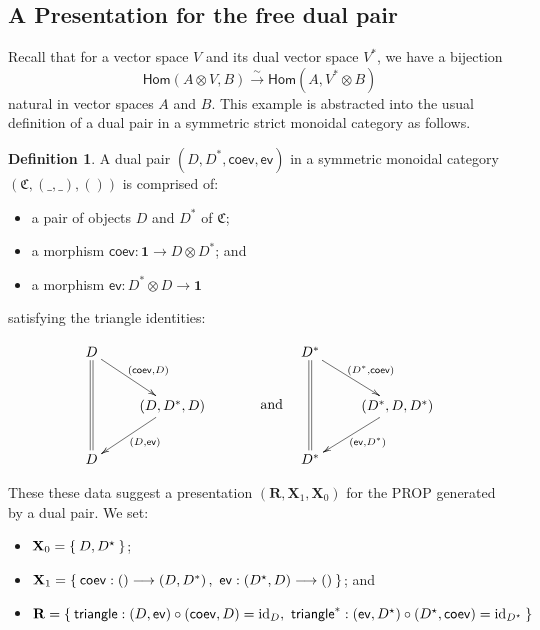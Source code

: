 \documentclass[pra,floatfix,
amsmath,superscriptaddress, 12pt]{article}
\theoremstyle{definition}
\newtheorem{defn}[thm]{Definition}
\newcommand{\liso}{\overset{\sim}{\longrightarrow}}
\newcommand{\evmap}{\mathsf{ev}}
\newcommand{\coev}{\mathsf{coev}}
\DeclareMathOperator{\id}{{\normalfont\text{id}}}
\begin{document}
\subsection{A Presentation for the free dual pair}
Recall that for a vector space $V$ and its dual vector space $V^{*}$,
we have a bijection 
\[
\mathsf{Hom}\left(A\otimes V,B\right)\liso\mathsf{Hom}\left(A,V^{*}\otimes B\right)
\]
 natural in vector spaces $A$ and $B$. This example is abstracted
into the usual definition of a dual pair in a symmetric strict monoidal
category as follows.
\begin{defn}
A dual pair $\left(D,D^{*},\coev,\evmap\right)$ in a symmetric monoidal
category $\left(\mathfrak{C},\left(\_,\_\right),\left(\right)\right)$
is comprised of:
\begin{itemize}
\item a pair of objects $D$ and $D^{*}$ of $\mathfrak{C}$;
\item a morphism $\coev:\mathbf{1}\longrightarrow D\otimes D^{*}$; and
\item a morphism $\evmap:D^{*}\otimes D\longrightarrow\mathbf{1}$
\end{itemize}
satisfying the triangle identities:

\begin{align*}
    \vcenter{\vbox{\xymatrix{
        D\ar@{=}[dd]
        \ar[dr]^{\left(\coev,D\right)}
            \\
            &
            \left(D,D^{*},D\right)
            \ar[dl]^{\left(D,\evmap\right)}
                \\
        D
    }}}
        &
        \mathrm{ \ \ \ \ \ \ \ \ \ \  \ and }
            &
            \vcenter{\vbox{\xymatrix{
                D^{*}
                \ar@{=}[dd]
                \ar[dr]^{\left(D^{*},\coev\right)}
                    \\
                    &
                    \left(D^{*},D,D^{*}\right)
                    \ar[dl]^{\left(\evmap,D^{*}\right)}
                        \\
                D^{*}
    }}}
    \end{align*}
\end{defn}

These these data suggest a presentation $(\mathbf{R},\mathbf{X}_1,\mathbf{X}_0)$ for the \textsf{PROP}
generated by a dual pair. We set:

\begin{itemize}
    \item $\mathbf{X}_0 = \Set{D,D^\star}$;
    \item $\mathbf{X}_1 = \Set{
        \coev:\left(\right) \longrightarrow \left(D,D^{*}\right), \
        \evmap:\left(D^{\star},D\right)\longrightarrow \left(\right)
    }$; and
    \item $\mathbf{R} =
    \Set{
        \mathsf{triangle}:(D,\evmap) \circ (\coev,D) = \id_{D}, \ 
        \mathsf{triangle}^{*}:(\evmap,D^\star)\circ(D^\star,\coev) = \id_{D^\star}
    }$
\end{itemize}
\end{document}
